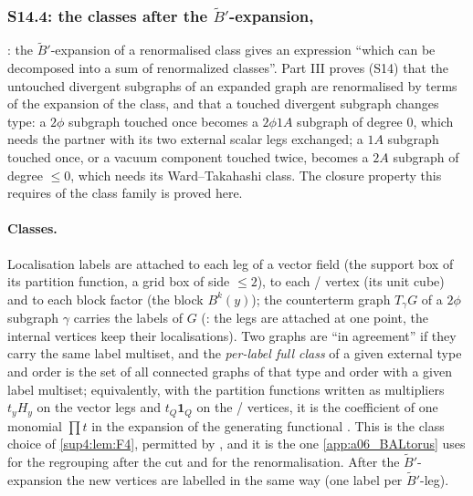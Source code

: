 
\subsubsection{S14.4: the classes after the $\tilde B'$-expansion, \cite[p.~433]{Ba3}}\label{sup4:ssec:S144}

\cite[p.~433]{Ba3}: the $\tilde B'$-expansion of a renormalised class gives an expression ``which can be decomposed into a sum of renormalized classes''. Part III proves (S14) that the untouched divergent subgraphs of an expanded graph are renormalised by terms of the expansion of the class, and that a touched divergent subgraph changes type: a $2\phi$ subgraph touched once becomes a $2\phi1A$ subgraph of degree $0$, which needs the partner with its two external scalar legs exchanged; a $1A$ subgraph touched once, or a vacuum component touched twice, becomes a $2A$ subgraph of degree $\le0$, which needs its Ward--Takahashi class. The closure property this requires of the class family is proved here.

\paragraph{Classes.} Localisation labels are attached to each leg of a vector field (the support box of its partition function, a grid box of side $\le2$), to each \cite[(1.6)]{Ba3}/\cite[(1.7)]{Ba3} vertex (its unit cube) and to each block factor \cite[(1.13)--(1.15)]{Ba3} (the block $B^k(y)$); the counterterm graph $T_\gamma G$ of a $2\phi$ subgraph $\gamma$ carries the labels of $G$ (\cite[p.~417]{Ba3}: the legs are attached at one point, the internal vertices keep their localisations). Two graphs are ``in agreement'' \cite[p.~432]{Ba3} if they carry the same label multiset, and the \emph{per-label full class} of a given external type and order is the set of all connected graphs of that type and order with a given label multiset; equivalently, with the partition functions written as multipliers $t_yH_y$ on the vector legs and $t_Q\mathbf 1_Q$ on the \cite[(1.6)]{Ba3}/\cite[(1.7)]{Ba3} vertices, it is the coefficient of one monomial $\prod t$ in the expansion of the generating functional \cite[(1.5)]{Ba3}. This is the class choice of \cref{sup4:lem:F4}, permitted by \cite[p.~431]{Ba3}, and it is the one \cref{app:a06_BALtorus} uses for the regrouping after the cut and for the renormalisation. After the $\tilde B'$-expansion the new vertices are labelled in the same way (one label per $\tilde B'$-leg).

